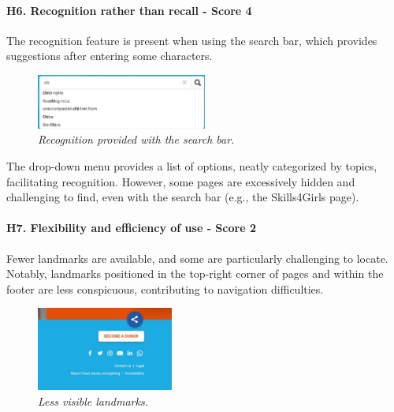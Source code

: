 \paragraph{H6. Recognition rather than recall - Score 4}	The recognition feature is present when using the search bar, which provides suggestions after entering some characters.
\begin{figure}[!h]
	\begin{center}
		\includegraphics[width=0.5\textwidth]{Picture3.jpg}
		\captionsetup{font=small}
		\caption{\textit{Recognition provided with the search bar.}}
	\end{center}
\end{figure}
\newline The drop-down menu provides a list of options, neatly categorized by topics, facilitating recognition. However, some pages are excessively hidden and challenging to find, even with the search bar (e.g., the Skills4Girls page).
\newline
\paragraph{H7. Flexibility and efficiency of use - Score 2}	Fewer landmarks are available, and some are particularly challenging to locate. Notably, landmarks positioned in the top-right corner of pages and within the footer are less conspicuous, contributing to navigation difficulties.
\begin{figure}[!h]
	\begin{center}
		\includegraphics[width=0.4\textwidth]{Picture4.jpg}
		\captionsetup{font=small}
		\caption{\textit{Less visible landmarks.}}
	\end{center}
\end{figure}
\newline
